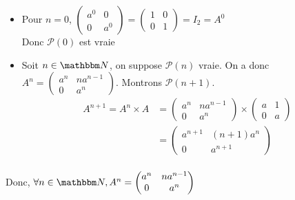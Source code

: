 \begin{enumerate}
		\begin{itemize}
			\item Pour $n = 0$, $\begin{pmatrix}
					a^0&0\\
					0&a^0
				\end{pmatrix} = \begin{pmatrix}
					1&0\\
					0&1
				\end{pmatrix} = I_2 = A^0$\\
				Donc $\mathcal{P}(0)$ est vraie
			\item Soit $n \in \N$, on suppose $\mathcal{P}(n)$ vraie. On a donc $A^n = \begin{pmatrix}
				a^n&na^{n-1}\\
				0&a^n
			\end{pmatrix}$. Montrons $\mathcal{P}(n+1)$.\\
			\begin{align*}
				A^{n+1} = A^n \times A &= \begin{pmatrix}
					a^n&na^{n-1}\\
					0&a^n
				\end{pmatrix} \times \begin{pmatrix}
					a&1\\
					0&a
				\end{pmatrix}\\
				&= \begin{pmatrix}
					a^{n+1}&(n+1)a^n\\
					0&a^{n+1}
				\end{pmatrix}  \\
			\end{align*}
		\end{itemize}
		Donc, $\forall n \in \N, A^n = \begin{pmatrix}
			a^n&na^{n-1}\\
			0&a^n
		\end{pmatrix}$
\end{enumerate}
